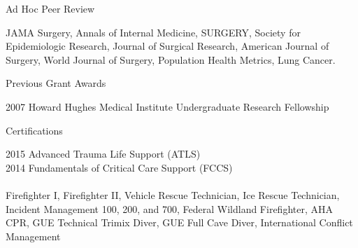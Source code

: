 \documentclass{resume} %
\begin{document}
   
   
   \begin{rSection}{Ad Hoc Peer Review}
 
   JAMA Surgery, Annals of Internal Medicine, SURGERY, Society for Epidemiologic Research, Journal of Surgical Research, American Journal of Surgery, World Journal of Surgery, Population Health Metrics, Lung Cancer.
  
   
   \end{rSection}
   
 
   
   \begin{rSection}{Previous Grant Awards}
  
   2007 \enspace Howard Hughes Medical Institute Undergraduate Research Fellowship 
   
   
   \end{rSection}
   
   
   \begin{rSection}{Certifications}
  
   2015 \enspace Advanced Trauma Life Support (ATLS)\\
   2014 \enspace Fundamentals of Critical Care Support (FCCS) \\
   \\
   Firefighter I, Firefighter II, Vehicle Rescue Technician, Ice Rescue Technician, 
   Incident Management 100, 200, and 700, Federal Wildland Firefighter, AHA CPR,
   GUE Technical Trimix Diver, GUE Full Cave Diver, International Conflict Management
   
   
   \end{rSection}
   

\end{document}
